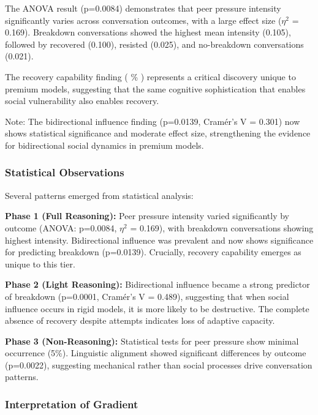 \documentclass[11pt,letterpaper]{article}
\newcommand{\exponedataTotalSessionsRaw}{67}
\newcommand{\exponedataRecoverySessionsRaw}{9}
\newcommand{\exponedataRecoveryPercentage}{%
  \fpeval{round(\exponedataRecoverySessionsRaw / \exponedataTotalSessionsRaw * 100, 1)}\%
}
\newcommand{\exponedataBidirectionalPValue}{p=0.0139}
\newcommand{\exponedataPeerPressureANOVAPValue}{p=0.0084}
\newcommand{\exptwoBidirectionalPValue}{p=0.0001}
\newcommand{\exptwoBidirectionalCramersV}{0.489}
\newcommand{\expthreeLinguisticAlignmentPValue}{p=0.0022}
\begin{document}
The ANOVA result (\exponedataPeerPressureANOVAPValue{}) demonstrates that peer pressure intensity significantly varies across conversation outcomes, with a large effect size ($\eta^2$ = 0.169). Breakdown conversations showed the highest mean intensity (0.105), followed by recovered (0.100), resisted (0.025), and no-breakdown conversations (0.021). 

The recovery capability finding (\exponedataRecoveryPercentage{}) represents a critical discovery unique to premium models, suggesting that the same cognitive sophistication that enables social vulnerability also enables recovery.

Note: The bidirectional influence finding (\exponedataBidirectionalPValue{}, Cramér's V = 0.301) now shows statistical significance and moderate effect size, strengthening the evidence for bidirectional social dynamics in premium models.


\subsubsection{Statistical Observations}

Several patterns emerged from statistical analysis:

\textbf{Phase 1 (Full Reasoning):} Peer pressure intensity varied significantly by outcome (ANOVA: \exponedataPeerPressureANOVAPValue{}, $\eta^2$ = 0.169), with breakdown conversations showing highest intensity. Bidirectional influence was prevalent and now shows significance for predicting breakdown (\exponedataBidirectionalPValue{}). Crucially, recovery capability emerges as unique to this tier.

\textbf{Phase 2 (Light Reasoning):} Bidirectional influence became a strong predictor of breakdown (\exptwoBidirectionalPValue{}, Cramér's V = \exptwoBidirectionalCramersV{}), suggesting that when social influence occurs in rigid models, it is more likely to be destructive. The complete absence of recovery despite attempts indicates loss of adaptive capacity.

\textbf{Phase 3 (Non-Reasoning):} Statistical tests for peer pressure show minimal occurrence (5\%). Linguistic alignment showed significant differences by outcome (\expthreeLinguisticAlignmentPValue{}), suggesting mechanical rather than social processes drive conversation patterns.

\subsubsection{Interpretation of Gradient}
\end{document}
